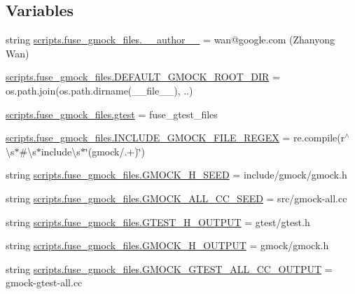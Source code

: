 \subsection*{Variables}
\begin{DoxyCompactItemize}
\item 
string \mbox{\hyperlink{namespacescripts_1_1fuse__gmock__files_ab8ef854b15559c73a33c547d25d147cd}{scripts.\+fuse\+\_\+gmock\+\_\+files.\+\_\+\+\_\+author\+\_\+\+\_\+}} = \textquotesingle{}wan@google.\+com (Zhanyong Wan)\textquotesingle{}
\item 
\mbox{\hyperlink{namespacescripts_1_1fuse__gmock__files_a947a9f3792bdc4e0c123ab07c4aca351}{scripts.\+fuse\+\_\+gmock\+\_\+files.\+D\+E\+F\+A\+U\+L\+T\+\_\+\+G\+M\+O\+C\+K\+\_\+\+R\+O\+O\+T\+\_\+\+D\+IR}} = os.\+path.\+join(os.\+path.\+dirname(\+\_\+\+\_\+file\+\_\+\+\_\+), \textquotesingle{}..\textquotesingle{})
\item 
\mbox{\hyperlink{namespacescripts_1_1fuse__gmock__files_abac621254318af1d50efcfe01cdda7c6}{scripts.\+fuse\+\_\+gmock\+\_\+files.\+gtest}} = fuse\+\_\+gtest\+\_\+files
\item 
\mbox{\hyperlink{namespacescripts_1_1fuse__gmock__files_a38812225efc17d0c658db256508ca050}{scripts.\+fuse\+\_\+gmock\+\_\+files.\+I\+N\+C\+L\+U\+D\+E\+\_\+\+G\+M\+O\+C\+K\+\_\+\+F\+I\+L\+E\+\_\+\+R\+E\+G\+EX}} = re.\+compile(r\textquotesingle{}$^\wedge$\textbackslash{}s$\ast$\#\textbackslash{}s$\ast$include\textbackslash{}s$\ast$\char`\"{}(gmock/.+)\char`\"{}\textquotesingle{})
\item 
string \mbox{\hyperlink{namespacescripts_1_1fuse__gmock__files_a0e8f341749b2deb3e077cad12df2209e}{scripts.\+fuse\+\_\+gmock\+\_\+files.\+G\+M\+O\+C\+K\+\_\+\+H\+\_\+\+S\+E\+ED}} = \textquotesingle{}include/gmock/gmock.\+h\textquotesingle{}
\item 
string \mbox{\hyperlink{namespacescripts_1_1fuse__gmock__files_a4ca673dfd339655f0be298f55a3ded66}{scripts.\+fuse\+\_\+gmock\+\_\+files.\+G\+M\+O\+C\+K\+\_\+\+A\+L\+L\+\_\+\+C\+C\+\_\+\+S\+E\+ED}} = \textquotesingle{}src/gmock-\/all.\+cc\textquotesingle{}
\item 
string \mbox{\hyperlink{namespacescripts_1_1fuse__gmock__files_a85191351eec7ea73a41a3eb8ca23fb6c}{scripts.\+fuse\+\_\+gmock\+\_\+files.\+G\+T\+E\+S\+T\+\_\+\+H\+\_\+\+O\+U\+T\+P\+UT}} = \textquotesingle{}gtest/gtest.\+h\textquotesingle{}
\item 
string \mbox{\hyperlink{namespacescripts_1_1fuse__gmock__files_a22a28e398c178b161b3f7603fa1111b7}{scripts.\+fuse\+\_\+gmock\+\_\+files.\+G\+M\+O\+C\+K\+\_\+\+H\+\_\+\+O\+U\+T\+P\+UT}} = \textquotesingle{}gmock/gmock.\+h\textquotesingle{}
\item 
string \mbox{\hyperlink{namespacescripts_1_1fuse__gmock__files_aa85d813dab1a2b182bdb6e0f98a53090}{scripts.\+fuse\+\_\+gmock\+\_\+files.\+G\+M\+O\+C\+K\+\_\+\+G\+T\+E\+S\+T\+\_\+\+A\+L\+L\+\_\+\+C\+C\+\_\+\+O\+U\+T\+P\+UT}} = \textquotesingle{}gmock-\/gtest-\/all.\+cc\textquotesingle{}
\end{DoxyCompactItemize}
